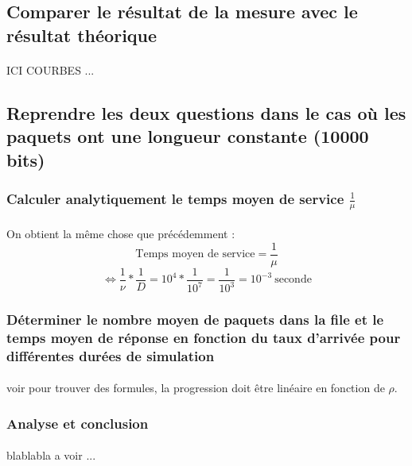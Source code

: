         \subsection{Comparer le résultat de la mesure avec le résultat théorique}
            \paragraph{}
ICI COURBES ...
%
        \subsection{Reprendre les deux questions dans le cas où les paquets ont une longueur constante (10000 bits)}
%
            \subsubsection{Calculer analytiquement le temps moyen de service $\frac{1}{\mu}$}
%
                \paragraph{}
On obtient la même chose que précédemment :
\[  \text{Temps moyen de service} = \frac{1}{\mu} \]
\[ \iff \frac{1}{\nu} * \frac{1}{D} = 10^{4} * \frac{1}{10^{7}} = \frac{1}{10^{3}} = 10^{-3} \ \text{seconde} \]
%
            \subsubsection{Déterminer le nombre moyen de paquets dans la file et le temps moyen de réponse en fonction du taux d'arrivée pour différentes durées de simulation}
%
                \paragraph{}
voir pour trouver des formules, la progression doit être linéaire en fonction de $\rho$.
%
            \subsubsection{Analyse et conclusion}
%
                \paragraph{}
blablabla a voir ...
%
    \clearpage
%
